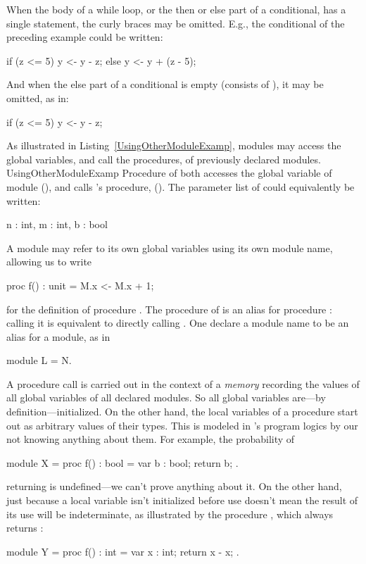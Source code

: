 When the body of a while loop, or the then or else part of a conditional,
has a single statement, the curly braces may be omitted. E.g., the
conditional of the preceding example could be written:
\begin{easycrypt}{}{}
if (z <= 5) y <- y - z;
else y <- y + (z - 5);
\end{easycrypt}
And when the else part of a conditional is empty (consists of
\ec{\{\}}), it may be omitted, as in:
\begin{easycrypt}{}{}
if (z <= 5) y <- y - z;
\end{easycrypt}

As illustrated in Listing~\ref{UsingOtherModuleExamp}, modules may
access the global variables, and call the procedures, of previously
declared modules.
 {}{UsingOtherModuleExamp} Procedure
 of  both accesses the global variable  of module
 (), and calls 's procedure,  ().
The parameter list of  could equivalently be written:
\begin{easycrypt}{}{}
n : int, m : int, b : bool  
\end{easycrypt}
A module may refer to its own global variables using its own module
name, allowing us to write
\begin{easycrypt}{}{}
proc f() : unit = {
  M.x <- M.x + 1;
}
\end{easycrypt}
for the definition of procedure .  The procedure  of
 is an alias for procedure : calling it is equivalent to
directly calling .
One declare a module name to be an alias for a module, as in
\begin{easycrypt}{}{}
module L = N.
\end{easycrypt}

A procedure call is carried out in the context of a \emph{memory}
recording the values of all global variables of all declared modules.
So all global variables are---by definition---initialized. On the
other hand, the local variables of a procedure start out as arbitrary
values of their types.  This is modeled in \EasyCrypt's program logics
by our not knowing anything about them. For example, the probability
of 
\begin{easycrypt}{}{}
module X = {
  proc f() : bool = {
    var b : bool;
    return b;
  }
}.
\end{easycrypt}
returning  is undefined---we can't prove anything about it.
On the other hand, just because a local variable isn't initialized
before use doesn't mean the result of its use will be indeterminate,
as illustrated by the procedure , which always returns :
\begin{easycrypt}{}{}
module Y = {
  proc f() : int = {
    var x : int;
    return x - x;
  }
}.
\end{easycrypt}


